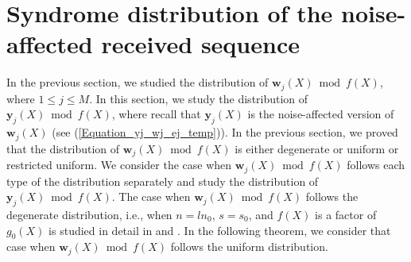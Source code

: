 \documentclass[10pt,journal]{IEEEtran}
\begin{document}
\section{Syndrome distribution of the noise-affected received sequence}
\label{Section_cyclic_structure_noise_affected}
% 
In the previous section, we studied the distribution of $\mathbf{w}_j(X) \bmod f(X)$, where $1 \leq j \leq M$.
In this section, we study the distribution of $\mathbf{y}_j(X) \bmod f(X)$, where recall that 
$\mathbf{y}_j(X)$ is the noise-affected version of $\mathbf{w}_j(X)$ (see (\ref{Equation_yj_wj_ej_temp})).
% 
In the previous section, we proved that the distribution of $\mathbf{w}_j(X) \bmod f(X)$ is either degenerate or
uniform or restricted uniform.
% 
We consider the case when $\mathbf{w}_j(X) \bmod f(X)$ follows each type of the distribution separately
and study the distribution of $\mathbf{y}_j(X) \bmod f(X)$.
% 
The case when $\mathbf{w}_j(X) \bmod f(X)$ follows the degenerate distribution, i.e., when $n=ln_0$, $s=s_0$, and
$f(X)$ is a factor of $g_0(X)$ is studied in detail in \cite{EuropeanWireless2014} and \cite{TCOMM_2016}.
% 
In the following theorem, we consider that case when $\mathbf{w}_j(X) \bmod f(X)$ follows the uniform distribution.
\end{document}
